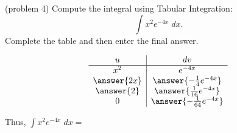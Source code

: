 \documentclass[handout]{ximera}
\begin{document}
\begin{problem}(problem 4)
Compute the integral using Tabular Integration:
  \[
  \int x^2 e^{-4x} \;dx.
  \]
Complete the table and then enter the final answer.
\begin{center}
\[
\begin{array}{c|c}
		u & dv  \\\hline 
		x^2 & e^{-4x} \\  
      \answer{2x} & \answer{-\frac14 e^{-4x}} \\ 
       \answer{2} & \answer{\frac{1}{16} e^{-4x}} \\
       0 & \answer{-\frac{1}{64} e^{-4x}} 
	\end{array}
    \]
\end{center}



Thus, $\displaystyle{  \int x^2 e^{-4x} \;dx = }$
  \begin{multipleChoice}
\end{multipleChoice}
  
\end{problem}
\end{document}
